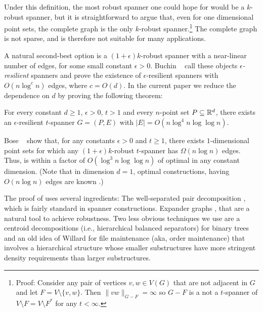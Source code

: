 \documentclass{patmorin}
\begin{document}
Under this definition, the most robust spanner one could hope for
would be a $k$-robust spanner, but it is straightforward to argue
that, even for one dimensional point sets, the complete graph is the
only $k$-robust spanner.\footnote{Proof: Consider any pair of vertices
$v,w\in V(G)$ that are not adjacent in $G$ and let $F=V\setminus\{v,w\}$.
Then $\|vw\|_{G-F}=\infty$ so $G-F$ is a not a $t$-spanner of $V\setminus
F=V\setminus F^*$ for any $t<\infty$.} The complete graph is not sparse,
and is therefore not suitable for many applications.

A natural second-best option is a $(1+\epsilon)k$-robust spanner with
a near-linear number of edges, for some small constant $\epsilon >0$.
Buchin \etal\ \cite{buchin.har-peled.ea:spanner} call these objects
\emph{$\epsilon$-resilient} spanners and prove the existence of
$\epsilon$-resilient spanners with $O(n\log^c n)$ edges, where $c=O(d)$.
In the current paper we reduce the dependence on $d$ by proving the
following theorem:

\begin{thm}
  For every constant $d\ge 1$, $\epsilon>0$, $t>1$ and every $n$-point
  set $P\subseteq\mathbb{R}^d$, there exists an $\epsilon$-resilient $t$-spanner
  $G=(P,E)$ with $|E|=O(n\log^4 n\log\log n)$.
\end{thm}

Bose \etal\ \cite{bose.dujmovic.ea:robust} show that, for any constants
$\epsilon>0$ and $t\ge 1$, there exists $1$-dimensional point sets
for which any $(1+\epsilon)k$-robust $t$-spanner has $\Omega(n\log
n)$ edges.  Thus,  is within a factor of $O(\log^3
n\log\log n)$ of optimal in any constant dimension.  (Note that in
dimension $d=1$, optimal constructions, having $O(n\log n)$ edges are known
\cite{buchin.har-peled.ea:spanner}.)

The proof of  uses several ingredients: The well-separated
pair decomposition \cite{callahan.kosaraju:decomposition}, which
is fairly standard in spanner constructions.  Expander graphs
\cite{hoory.linial.ea:expanders}, that are a natural tool to
achieve robustness. Two less obvious techniques we use are a centroid
decompositions (i.e., hierarchical balanced separators) for binary trees
and an old idea of Willard \cite{willard:maintaining} for file maintenance
(aka, order maintenance) that involves a hierarchical structure whose
smaller substructures have more stringent density requirements than
larger substructures.
\end{document}
